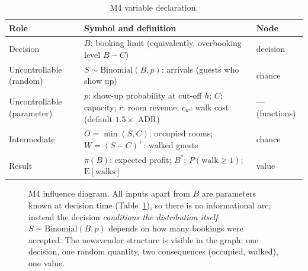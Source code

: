 \begin{table}[H]
\centering
\caption{M4 variable declaration.}
\label{tab:m4vars}
\begin{tabularx}{0.92\textwidth}{@{}l X l@{}}
\toprule
\textbf{Role} & \textbf{Symbol and definition} & \textbf{Node} \\
\midrule
Decision & $B$: booking limit (equivalently, overbooking level $B - C$) & decision \\
Uncontrollable (random) & $S \sim \mathrm{Binomial}(B, p)$: arrivals (guests who show up) & chance \\
Uncontrollable (parameter) & $p$: show-up probability at cut-off $h$; $C$: capacity; $r$: room revenue; $c_w$: walk cost (default $1.5\times$ ADR) & --- (functions) \\
Intermediate & $O = \min(S, C)$: occupied rooms; $W = (S - C)^{+}$: walked guests & chance \\
Result & $\pi(B)$: expected profit; $B^{*}$; $P(\text{walk} \geq 1)$; $\mathrm{E}[\text{walks}]$ & value \\
\bottomrule
\end{tabularx}
\end{table}

\begin{figure}[H]
\centering
{}
\caption{M4 influence diagram. All inputs apart from $B$ are parameters known at decision time (Table~\ref{tab:m4vars}), so there is no informational arc; instead the decision \emph{conditions the distribution itself}: $S \sim \mathrm{Binomial}(B, p)$ depends on how many bookings were accepted. The newsvendor structure is visible in the graph: one decision, one random quantity, two consequences (occupied, walked), one value.}
\label{fig:id-m4}
\end{figure}

